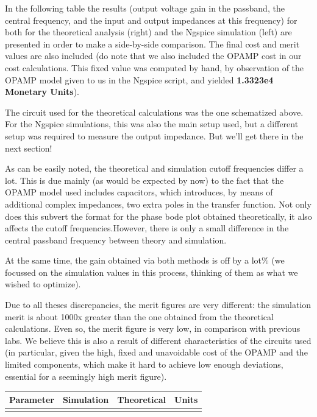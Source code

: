 In the following table the results (output voltage gain in the passband, the central frequency, and the input and output impedances at this frequency) for both for the theoretical analysis (right) and the Ngspice simulation (left) are presented in order to make a side-by-side comparison. The final cost and merit values are also included (do note that we also included the OPAMP cost in our cost calculations. This fixed value was computed by hand, by observation of the OPAMP model given to us in the Ngspice script, and yielded \textbf{1.3323e4 Monetary Units}).\par
The circuit used for the theoretical calculations was the one schematized above. For the Ngspice simulations, this was also the main setup used, but a different setup was required to measure the output impedance. But we'll get there in the next section!\par
As can be easily noted, the theoretical and simulation cutoff frequencies differ a lot. This is due mainly (as would be expected by now) to the fact that the OPAMP model used includes capacitors, which introduces, by means of additional complex impedances, two extra poles in the transfer function. Not only does this subvert the format for the phase bode plot obtained theoretically, it also affects the cutoff frequencies.However, there is only a small difference in the central passband frequency between theory and simulation. \par
At the same time, the gain obtained via both methods is off by a lot\% (we focussed on the simulation values in this process, thinking of them as what we wished to optimize).\par
Due to all theses discrepancies, the merit figures are very different: the simulation merit is about 1000x greater than the one obtained from the theoretical calculations. Even so, the merit figure is very low, in comparison with previous labs. We believe this is also a result of different characteristics of the circuits used (in particular, given the high, fixed and unavoidable cost of the OPAMP and the limited components, which make it hard to achieve low enough deviations, essential for a seemingly high merit figure).\par

\hfill
 \parbox{1\linewidth}{
  \centering
  \begin{tabular}{|l|l|l|r|}
    \hline    
    {\bf Parameter} & {\bf Simulation} & {\bf Theoretical } & {\bf Units }\\ \hline
    
  \label{tab:results}
  \end{tabular}
  }
  
